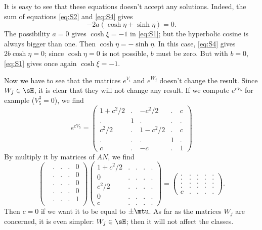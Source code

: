 It is easy to see that these equations doesn't accept any solutions. Indeed, the sum of equations \eqref{eq:S2} and \eqref{eq:S4} gives
\[
   -2a(\cosh\eta+\sinh\eta)=0.
\]
The possibility $a=0$ gives $\cosh\xi=-1$ in \eqref{eq:S1}; but the hyperbolic cosine is always bigger than one. Then $\cosh\eta=-\sinh\eta$. In this case, \eqref{eq:S4} gives $2b\cosh\eta=0$; since $\cosh\eta=0$ is not possible, $b$ must be zero. But with $b=0$, \eqref{eq:S1} gives once again $\cosh\xi=-1$.

Now we have to see that the matrices $e^{V_i}$ and $e^{W_j}$ doesn't change the result\label{pg:influence_V_W}. Since $W_j\in\sH$, it is clear that they will not change any result. If we compute $e^{cV_5}$ for example ($V_5^3=0$), we find
\begin{equation}		\label{EqExpDeV}
   e^{cV_5}=
\begin{pmatrix}
1+c^2/2	&		.	&	 -c^2/2	&	.	&	c\\
.		&	1	&	.	&	.	&	.\\
c^2/2		&	.	&	1-c^2/2	&	.	&	c\\
.		&	.	&	.	&	1	&	.\\
c		&	.	&	-c	&	.	&	1
\end{pmatrix}
\end{equation}
By multiply it by matrices of $AN$, we find
\[
\begin{pmatrix}
 &.&.&.&0\\
 &.&.&.&0\\
 &.&.&.&0\\
 &.&.&.&0\\
 &.&.&.&1\\
\end{pmatrix}
\begin{pmatrix}
 1+c^2/2&.&.&.&.\\
 0&.&.&.&.\\
 c^2/2&.&.&.&.\\
 0&.&.&.&.\\
 c&.&.&.&.
\end{pmatrix}
=
\begin{pmatrix}
 .&.&.&.&.\\
 .&.&.&.&.\\
 .&.&.&.&.\\
 .&.&.&.&.\\
 c&.&.&.&.
\end{pmatrix}.
\]
Then $c=0$ if we want it to be equal to $\pm\mtu$. As far as the matrices $W_j$ are concerned, it is even simpler: $W_j\in\sH$; then it will not affect the classes.

